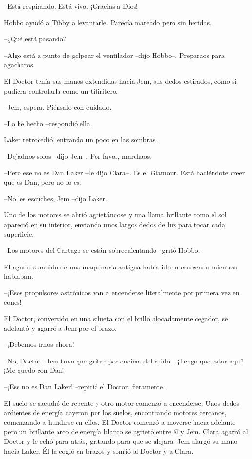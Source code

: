 {--Está respirando. Está vivo. ¡Gracias a Dios!}

{Hobbo ayudó a Tibby a levantarle. Parecía mareado pero sin heridas.}

{--¿Qué está pasando?}

{--Algo está a punto de golpear el ventilador --dijo Hobbo--. Preparaos
para agacharos.}

{El Doctor tenía sus manos extendidas hacia Jem, sus dedos estirados,
como si pudiera controlarla como un titiritero.}

{--Jem, espera. Piénsalo con cuidado.}

{--Lo he hecho --respondió ella.}

{Laker retrocedió, entrando un poco en las sombras.}

{--Dejadnos solos --dijo Jem--. Por favor, marchaos.}

{--Pero ese no es Dan Laker --le dijo Clara--. Es el Glamour. Está
haciéndote creer que es Dan, pero no lo es.}

{--No les escuches, Jem --dijo Laker.}

{Uno de los motores se abrió agrietándose y una llama brillante como el
 sol apareció en su interior, enviando unos largos dedos de luz para
tocar cada superficie.}

{--Los motores del Cartago se están sobrecalentando --gritó Hobbo.}

{El agudo zumbido de una maquinaria antigua había ido in crescendo
mientras hablaban.}

{--¡Esos propulsores astrónicos van a encenderse literalmente por primera
vez en eones!}

{El Doctor, convertido en una silueta con el brillo alocadamente cegador,
se adelantó y agarró a Jem por el brazo.}

{--¡Debemos irnos ahora!}

{--No, Doctor --Jem tuvo que gritar por encima del ruido--. ¡Tengo que
estar aquí! ¡Me quedo con Dan!}

{--¡Ese no es Dan Laker! --repitió el Doctor, fieramente.}

{El suelo se sacudió de repente y otro motor comenzó a encenderse. Unos
 dedos ardientes de energía cayeron por los suelos, encontrando motores
 cercanos, comenzando a hundirse en ellos. El Doctor comenzó a moverse
 hacia adelante pero un brillante arco de energía blanco se agrietó entre
 él y Jem. Clara agarró al Doctor y le echó para atrás, gritando para que
 se alejara. Jem alargó su mano hacia Laker. Él la cogió en brazos y
sonrió al Doctor y a Clara.}

